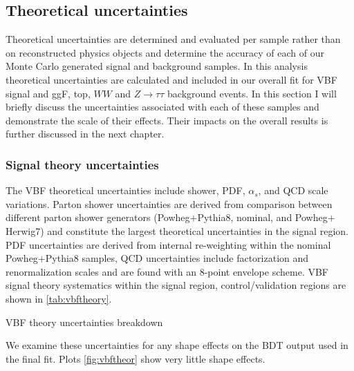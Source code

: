 \subsection{Theoretical uncertainties}
Theoretical uncertainties are determined and evaluated per sample rather than on reconstructed physics objects and determine the accuracy of each of our Monte Carlo generated signal and background samples. In this analysis theoretical uncertainties are calculated and included in our overall fit for VBF signal and ggF, top, $WW$ and $Z\rightarrow\tau\tau$ background events. In this section I will briefly discuss the uncertainties associated with each of these samples and demonstrate the scale of their effects. Their impacts on the overall results is further discussed in the next chapter. 

\subsubsection{Signal theory uncertainties}
The VBF theoretical uncertainties include shower, PDF, $\alpha_s$, and QCD scale variations. Parton shower uncertainties are derived from comparison between different parton shower generators (Powheg$+$Pythia8, nominal, and Powheg$+$Herwig7) and constitute the largest theoretical uncertainties in the signal region. PDF uncertainties are derived from internal re-weighting within the nominal Powheg$+$Pythia8 samples, QCD uncertainties include factorization and renormalization scales and are found with an 8-point envelope scheme. VBF signal theory systematics within the signal region, control/validation regions are shown in \ref{tab:vbftheory}.

\begin{table}[h!]
\scalebox{0.6}{

}
\caption{VBF theory uncertainties breakdown}
\label{tab:vbftheory}
\end{table}

We examine these uncertainties for any shape effects on the BDT output used in the final fit. Plots \ref{fig:vbftheor} show very little shape effects.

